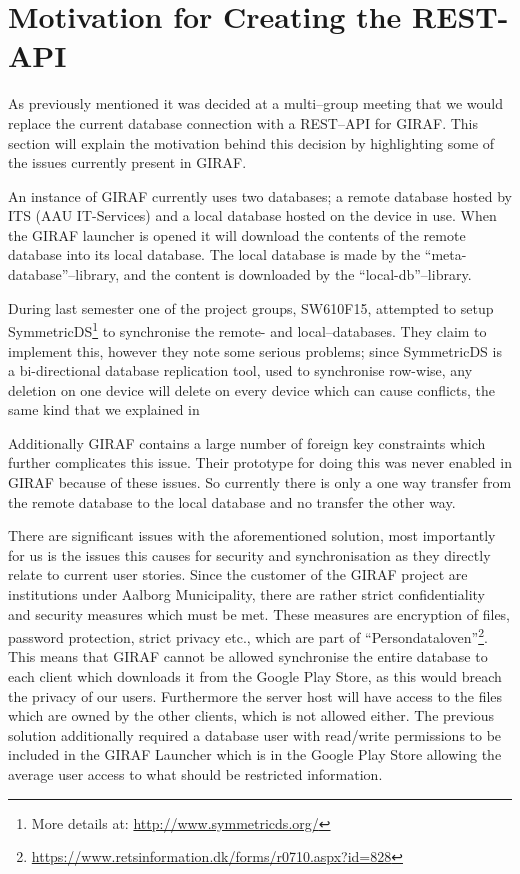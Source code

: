 \section{Motivation for Creating the REST-API} \label{sec:current} %
As previously mentioned it was decided at a multi--group meeting that we would replace the current database connection with a REST--API for GIRAF.
This section will explain the motivation behind this decision by highlighting some of the issues currently present in GIRAF.

An instance of GIRAF currently uses two databases; a remote database hosted by ITS (AAU IT-Services) and a local database hosted on the device in use.
When the GIRAF launcher is opened it will download the contents of the remote database into its local database.
The local database is made by the ``meta-database''--library, and the content is downloaded by the ``local-db''--library.

During last semester one of the project groups, SW610F15, attempted to setup SymmetricDS\footnote{More details at: \url{http://www.symmetricds.org/}} to synchronise the remote- and local--databases.
They claim to implement this, however they note some serious problems; since SymmetricDS is a bi-directional database replication tool, used to synchronise row-wise, any deletion on one device will delete on every device which can cause conflicts, the same kind that we explained in 

Additionally GIRAF contains a large number of foreign key constraints which further complicates this issue. 
Their prototype for doing this was never enabled in GIRAF because of these issues. 
So currently there is only a one way transfer from the remote database to the local database and no transfer the other way.

\bigskip
There are significant issues with the aforementioned solution, most importantly for us is the issues this causes for security and synchronisation as they directly relate to current user stories. 
Since the customer of the GIRAF project are institutions under Aalborg Municipality, there are rather strict confidentiality and security measures which must be met.
These measures are encryption of files, password protection, strict privacy etc., which are part of ``Persondataloven''\footnote{\url{https://www.retsinformation.dk/forms/r0710.aspx?id=828}}.
This means that GIRAF cannot be allowed synchronise the entire database to each client which downloads it from the Google Play Store, as this would breach the privacy of our users.
Furthermore the server host will have access to the files which are owned by the other clients, which is not allowed either.
The previous solution additionally required a database user with read/write permissions to be included in the GIRAF Launcher which is in the Google Play Store allowing the average user access to what should be restricted information.

